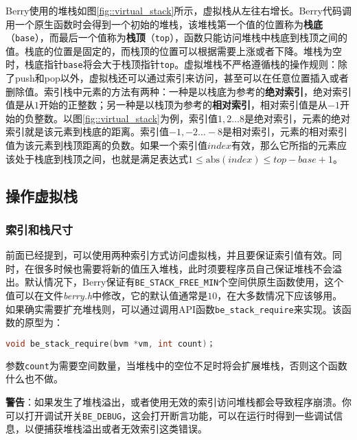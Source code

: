 Berry使用的堆栈如图\ref{fig::virtual_stack}所示，虚拟栈从左往右增长。Berry代码调用一个原生函数时会得到一个初始的堆栈，该堆栈第一个值的位置称为\textbf{栈底}（\texttt{base}），而最后一个值称为\textbf{栈顶}（\texttt{top}），函数只能访问堆栈中栈底到栈顶之间的值。栈底的位置是固定的，而栈顶的位置可以根据需要上涨或者下降。堆栈为空时，栈底指针\texttt{base}将会大于栈顶指针\texttt{top}。虚拟堆栈不严格遵循栈的操作规则：除了push和pop以外，虚拟栈还可以通过索引来访问，甚至可以在任意位置插入或者删除值。索引栈中元素的方法有两种：一种是以栈底为参考的\textbf{绝对索引}，绝对索引值是从$1$开始的正整数；另一种是以栈顶为参考的\textbf{相对索引}，相对索引值是从$-1$开始的负整数。以图\ref{fig::virtual_stack}为例，索引值$1,2\ldots 8$是绝对索引，元素的绝对索引就是该元素到栈底的距离。索引值$-1,-2\ldots -8$是相对索引，元素的相对索引值为该元素到栈顶距离的负数。如果一个索引值$index$有效，那么它所指的元素应该处于栈底到栈顶之间，也就是满足表达式$1\leq \mathrm{abs}(index)\leq top-base+1$。

\subsection{操作虚拟栈}

\subsubsection{索引和栈尺寸}

前面已经提到，可以使用两种索引方式访问虚拟栈，并且要保证索引值有效。同时，在很多时候也需要将新的值压入堆栈，此时须要程序员自己保证堆栈不会溢出。默认情况下，Berry保证有\texttt{BE\_STACK\_FREE\_MIN}个空间供原生函数使用，这个值可以在文件\textit{berry.h}中修改，它的默认值通常是$10$，在大多数情况下应该够用。如果确实需要扩充堆栈则，可以通过调用API函数\texttt{be\_stack\_require}来实现。该函数的原型为：
\begin{lstlisting}[language=c, numbers=none]
    void be_stack_require(bvm *vm, int count)；
\end{lstlisting}
参数\texttt{count}为需要空间数量，当堆栈中的空位不足时将会扩展堆栈，否则这个函数什么也不做。

\textbf{警告}：如果发生了堆栈溢出，或者使用无效的索引访问堆栈都会导致程序崩溃。你可以打开调试开关\texttt{BE\_DEBUG}，这会打开断言功能，可以在运行时得到一些调试信息，以便捕获堆栈溢出或者无效索引这类错误。
